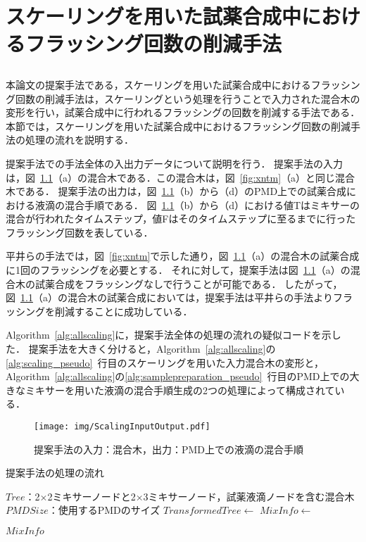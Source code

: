 \chapter{スケーリングを用いた試薬合成中におけるフラッシング回数の削減手法}
\section{}
本論文の提案手法である，スケーリングを用いた試薬合成中におけるフラッシング回数の削減手法は，スケーリングという処理を行うことで入力された混合木の変形を行い，試薬合成中に行われるフラッシングの回数を削減する手法である．
本節では，スケーリングを用いた試薬合成中におけるフラッシング回数の削減手法の処理の流れを説明する．

提案手法での手法全体の入出力データについて説明を行う．
提案手法の入力は，図~\ref{fig:ScalingInputOutput}（a）の混合木である．この混合木は，図~\ref{fig:xntm}（a）と同じ混合木である．
提案手法の出力は，図~\ref{fig:ScalingInputOutput}（b）から（d）のPMD上での試薬合成における液滴の混合手順である．
図~\ref{fig:ScalingInputOutput}（b）から（d）における値Tはミキサーの混合が行われたタイムステップ，値Fはそのタイムステップに至るまでに行ったフラッシング回数を表している．

平井らの手法では，図~\ref{fig:xntm}で示した通り，図~\ref{fig:ScalingInputOutput}（a）の混合木の試薬合成に1回のフラッシングを必要とする．
それに対して，提案手法は図~\ref{fig:ScalingInputOutput}（a）の混合木の試薬合成をフラッシングなしで行うことが可能である．
したがって，図~\ref{fig:ScalingInputOutput}（a）の混合木の試薬合成においては，提案手法は平井らの手法よりフラッシングを削減することに成功している．

Algorithm~\ref{alg:allscaling}に，提案手法全体の処理の流れの疑似コードを示した．
提案手法を大きく分けると，Algorithm~\ref{alg:allscaling}の\ref{alg:scaling_pseudo}~行目のスケーリングを用いた入力混合木の変形と，Algorithm~\ref{alg:allscaling}の\ref{alg:samplepreparation_pseudo}~行目のPMD上での大きなミキサーを用いた液滴の混合手順生成の2つの処理によって構成されている．

\begin{figure}[tbp]
 \centering\texttt{[image: img/ScalingInputOutput.pdf]}
 \caption{提案手法の入力：混合木，出力：PMD上での液滴の混合手順}\label{fig:ScalingInputOutput}
\end{figure}

\begin{algorithm}[tbp]
 \caption{提案手法の処理の流れ}\label{alg:allscaling}
 \begin{algorithmic}[1]
     \Require $\mathit{Tree}$：2$\times$2ミキサーノードと2$\times$3ミキサーノード，試薬液滴ノードを含む混合木
     \Require $\mathit{PMDSize}$：使用するPMDのサイズ
     \State $\mathit{TransformedTree} \gets$  \label{alg:scaling_pseudo}
     \State $\mathit{MixInfo \gets}$  \label{alg:samplepreparation_pseudo}

      \Return $\mathit{MixInfo}$
 \end{algorithmic}
\end{algorithm}

